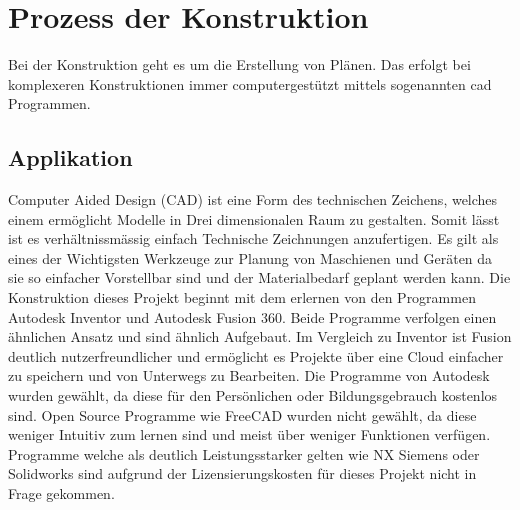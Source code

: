 {\section{Prozess der Konstruktion}
Bei der Konstruktion geht es um die Erstellung von Plänen. Das erfolgt bei komplexeren Konstruktionen immer computergestützt mittels sogenannten \ac{cad} Programmen. 

\subsection{Applikation}
Computer Aided Design (CAD) ist eine Form des technischen Zeichens, welches einem ermöglicht Modelle in Drei dimensionalen Raum zu gestalten. Somit lässt ist es verhältnissmässig einfach Technische Zeichnungen anzufertigen. Es gilt als eines der Wichtigsten Werkzeuge zur Planung von Maschienen und Geräten da sie so einfacher Vorstellbar sind und der Materialbedarf geplant werden kann. Die Konstruktion dieses Projekt beginnt mit dem erlernen von den Programmen Autodesk Inventor und Autodesk Fusion 360. 
Beide Programme verfolgen einen ähnlichen Ansatz und sind ähnlich Aufgebaut. Im Vergleich zu Inventor ist Fusion deutlich nutzerfreundlicher und ermöglicht es Projekte über eine Cloud einfacher zu speichern und von Unterwegs zu Bearbeiten. Die Programme von Autodesk wurden gewählt, da diese für den Persönlichen oder Bildungsgebrauch kostenlos sind. Open Source Programme wie FreeCAD wurden nicht gewählt, da diese weniger Intuitiv zum lernen sind und meist über weniger Funktionen verfügen. Programme welche als deutlich Leistungsstarker gelten wie NX Siemens oder Solidworks sind aufgrund der Lizensierungskosten für dieses Projekt nicht in Frage gekommen. 

}
